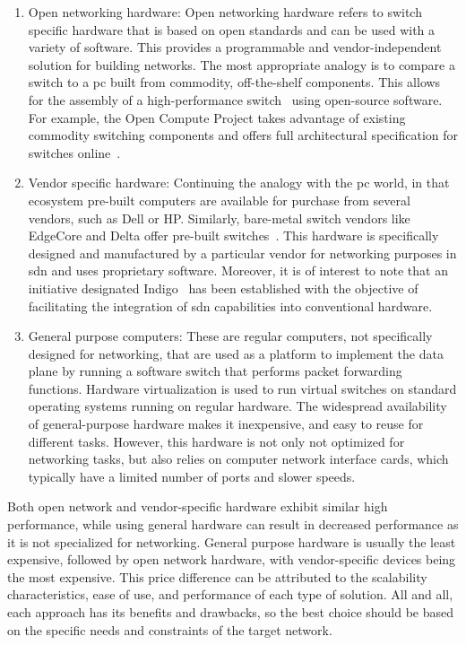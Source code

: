 \begin{enumerate}
\item Open networking hardware: 
    Open networking hardware refers to switch specific hardware that is based on open standards and can be used with a variety of software. This provides a programmable and vendor-independent solution for building networks. The most appropriate analogy is to compare a switch to a \gls{pc} built from commodity, off-the-shelf components. This allows for the assembly of a high-performance switch~\cite{peterson_software-defined_2021} using open-source software. For example, the Open Compute Project takes advantage of existing commodity switching components and offers full architectural specification for switches online~\cite{noauthor_open_nodate-1}.   

\item Vendor specific hardware:
    Continuing the analogy with the \gls{pc} world, in that ecosystem pre-built computers are available for purchase from several vendors, such as Dell or HP. Similarly, bare-metal switch vendors like EdgeCore and Delta offer pre-built switches~\cite{peterson_software-defined_2021}. This hardware is specifically designed and manufactured by a particular vendor for networking purposes in \gls{sdn} and uses proprietary software. Moreover, it is of interest to note that an initiative designated Indigo~\cite{noauthor_indigo_nodate} has been established with the objective of facilitating the integration of \gls{sdn} capabilities into conventional hardware.

\item General purpose computers:
    These are regular computers, not specifically designed for networking, that are used as a platform to implement the data plane by running a software switch that performs packet forwarding functions. Hardware virtualization is used to run virtual switches on standard operating systems running on regular hardware. The widespread availability of general-purpose hardware makes it inexpensive, and easy to reuse for different tasks. However, this hardware is not only not optimized for networking tasks, but also relies on computer network interface cards, which typically have a limited number of ports and slower speeds.
\end{enumerate}

Both open network and vendor-specific hardware exhibit similar high performance, while using general hardware can result in decreased performance as it is not specialized for networking. General purpose hardware is usually the least expensive, followed by open network hardware, with vendor-specific devices being the most expensive. This price difference can be attributed to the scalability characteristics, ease of use, and performance of each type of solution. All and all, each approach has its benefits and drawbacks, so the best choice should be based on the specific needs and constraints of the target network.

